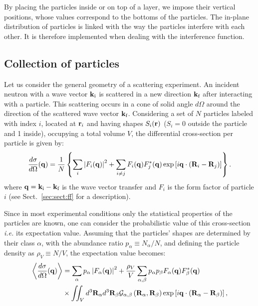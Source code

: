 By placing the particles
inside or on top of a layer, we impose their vertical positions, whose
values correspond to the bottoms of the particles. The in-plane distribution of particles is linked with the way the
particles interfere with each other. It is therefore implemented
when dealing with the interference function.


\subsection{Collection of particles} \label{sec:sect:interf}

Let us consider the general geometry of a scattering experiment. An incident neutron with a wave vector $\mathbf{k}_\text{i}$ is scattered in a new direction $\mathbf{k}_\text{f}$ after interacting with a particle. This scattering occurs in a cone of solid angle $d\Omega$ around the direction of the scattered wave vector $\mathbf{k}_\text{f}$.
Considering a set of $N$ particles labeled with index $i$, located at $\mathbf{r}_i$ and having shapes $S_i(\mathbf{r})$ ($S_i=0$ outside the particle and 1 inside), occupying a total volume $V$, the differential cross-section per particle is given by:
\begin{equation*}
  \frac{d\sigma}{d\Omega}(\mathbf{q}) = \frac{1}{N}\left\lbrace \sum_i \left\lvert F_i(\mathbf{q}) \right\rvert ^2 + \sum_{i\neq j} F_i(\mathbf{q}) F_{j}^*(\mathbf{q}) \exp \left[i\mathbf{q}\cdot (\mathbf{R}_i-\mathbf{R}_j)\right] \right\rbrace.
\end{equation*}
where  $\mathbf{q}=\mathbf{k}_\text{i} - \mathbf{k}_\text{f}$ is the wave vector transfer and $F_i$ is the form factor of particle $i$ (see Sect.~\ref{sec:sect:ff} for a description).

Since in most experimental conditions only the statistical properties of the particles are known, one can consider the probabilistic value of this cross-section \textit{i.e.} its expectation value. Assuming that the particles' shapes are determined by their class $\alpha$, with the abundance ratio $p_\alpha \equiv N_\alpha / N$, and defining the particle density as $\rho_V \equiv N/V$, the expectation value becomes:
\begin{align*}
  \left\langle \frac{d\sigma}{d\Omega}(\mathbf{q}) \right\rangle  & = \sum_\alpha p_\alpha \left\lvert F_\alpha(\mathbf{q})\right\rvert ^2 + \frac{\rho_V}{V}\sum_{\alpha,\beta} p_\alpha p_\beta F_\alpha (\mathbf{q})F_\beta^*(\mathbf{q})  \\
  & \times \iint_V d^3\mathbf{R}_\alpha d^3\mathbf{R}_\beta \mathcal{G}_{\alpha ,\beta}\left( \mathbf{R}_{\alpha} , \mathbf{R}_{\beta} \right) \exp \left[ i\mathbf{q}\cdot (\mathbf{R}_\alpha - \mathbf{R}_\beta ) \right],
\end{align*}

